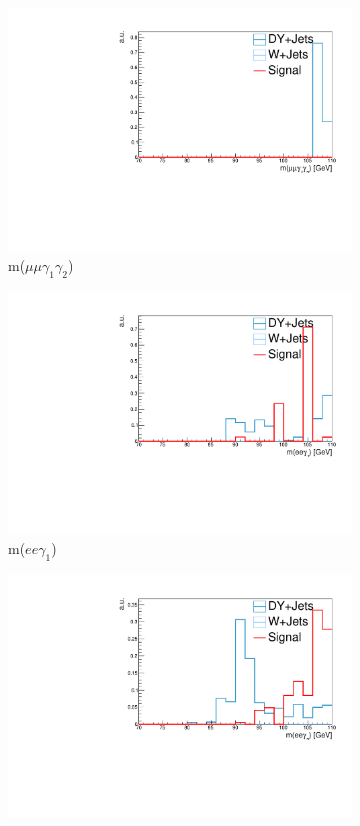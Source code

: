\begin{figure}[htb!]
\begin{subfigure}[h]{.32\linewidth}
		\includegraphics[width=\linewidth]{figs/05_analysis/2018_ZX_mass_MU_preFSR_mx20_comp.pdf}
		\caption{m($\mu\mu\gamma_1\gamma_2$)}
	\end{subfigure}
	\begin{subfigure}[h]{.32\linewidth}
		\centering
		\includegraphics[width=\linewidth]{figs/05_analysis/2018_ZX_Zg1_mass_ELE_preFSR_mx20_comp.pdf}
		\caption{m($ee\gamma_1$)}
	\end{subfigure}
	\begin{subfigure}[h]{.32\linewidth}
		\centering
		\includegraphics[width=\linewidth]{figs/05_analysis/2018_ZX_Zg2_mass_ELE_preFSR_mx20_comp.pdf}

\end{subfigure}
\end{figure}

